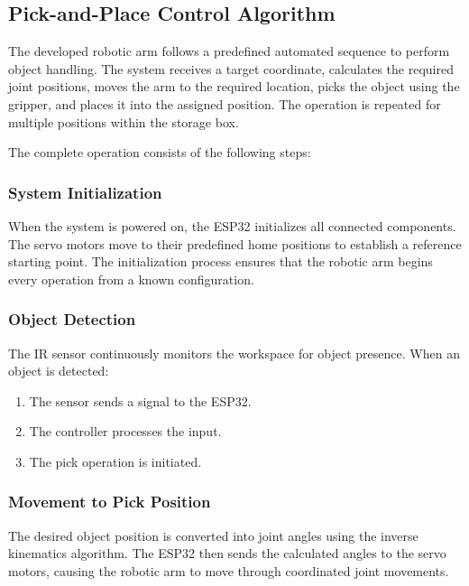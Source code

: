 \subsection{Pick-and-Place Control Algorithm}

The developed robotic arm follows a predefined automated sequence to perform object handling. The system receives a target coordinate, calculates the required joint positions, moves the arm to the required location, picks the object using the gripper, and places it into the assigned position. The operation is repeated for multiple positions within the storage box.

The complete operation consists of the following steps:

\subsubsection{System Initialization}

When the system is powered on, the ESP32 initializes all connected components. The servo motors move to their predefined home positions to establish a reference starting point. The initialization process ensures that the robotic arm begins every operation from a known configuration.

\subsubsection{Object Detection}

The IR sensor continuously monitors the workspace for object presence. When an object is detected:

\begin{enumerate}
    \item The sensor sends a signal to the ESP32.
    \item The controller processes the input.
    \item The pick operation is initiated.
\end{enumerate}

\subsubsection{Movement to Pick Position}

The desired object position is converted into joint angles using the inverse kinematics algorithm. The ESP32 then sends the calculated angles to the servo motors, causing the robotic arm to move through coordinated joint movements.

